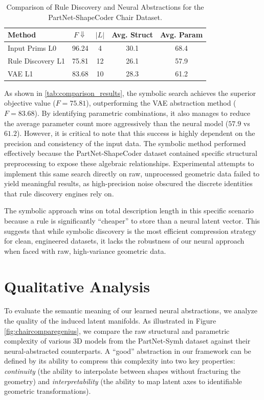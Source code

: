 \documentclass{thesis}
\begin{document}
\begin{table}[ht]
\centering
\caption{Comparison of Rule Discovery and Neural Abstractions for the PartNet-ShapeCoder Chair Dataset.}
\label{tab:comparison_results}
\begin{tabular}{l cccc}
\toprule
Method & $F \Downarrow$ & $|L|$ & Avg. Struct & Avg. Param \\
\midrule
Input Prims L0 & 96.24 & 4 & 30.1 & 68.4 \\
Rule Discovery L1 & 75.81 & 12 & 26.1 & 57.9 \\
VAE L1 & 83.68 & 10 & 28.3 & 61.2 \\
\bottomrule
\end{tabular}
\end{table} 

As shown in \autoref{tab:comparison_results}, the symbolic search achieves the superior objective value ($F = 75.81$), outperforming the VAE abstraction method ($F = 83.68$). By identifying parametric combinations, it also manages to reduce the average parameter count more aggressively than the neural model ($57.9$ vs $61.2$). However, it is critical to note that this success is highly dependent on the precision and consistency of the input data. The symbolic method performed effectively because the PartNet-ShapeCoder dataset contained specific structural preprocessing to expose these algebraic relationships. Experimental attempts to implement this same search directly on raw, unprocessed geometric data failed to yield meaningful results, as high-precision noise obscured the discrete identities that rule discovery engines rely on.

The symbolic approach wins on total description length in this specific scenario because a rule is significantly ``cheaper'' to store than a neural latent vector. This suggests that while symbolic discovery is the most efficient compression strategy for clean, engineered datasets, it lacks the robustness of our neural approach when faced with raw, high-variance geometric data.

\section{Qualitative Analysis}
\label{sec:qualitative}

To evaluate the semantic meaning of our learned neural abstractions, we analyze the quality of the induced latent manifolds. As illustrated in Figure \ref{fig:chaircomparegenius}, we compare the raw structural and parametric complexity of various 3D models from the PartNet-Symh dataset against their neural-abstracted counterparts. A ``good'' abstraction in our framework can be defined by its ability to compress this complexity into two key properties: \textit{continuity} (the ability to interpolate between shapes without fracturing the geometry) and \textit{interpretability} (the ability to map latent axes to identifiable geometric transformations).
\end{document}
